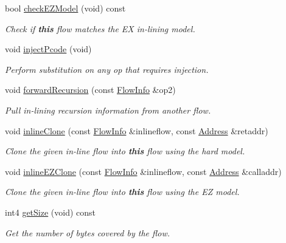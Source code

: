 \begin{DoxyCompactItemize}
bool \mbox{\hyperlink{class_flow_info_a30fc4e81c062827b6e9f31c6ab6cd983}{check\+E\+Z\+Model}} (void) const
\begin{DoxyCompactList}\small\item\em Check if {\bfseries{this}} flow matches the EX in-\/lining model. \end{DoxyCompactList}\item 
void \mbox{\hyperlink{class_flow_info_af91718ae694b4852c24f4af6cb0b07a0}{inject\+Pcode}} (void)
\begin{DoxyCompactList}\small\item\em Perform substitution on any op that requires {\itshape injection}. \end{DoxyCompactList}\item 
void \mbox{\hyperlink{class_flow_info_a47f656fb99cdb06587c0e86d86a6ff84}{forward\+Recursion}} (const \mbox{\hyperlink{class_flow_info}{Flow\+Info}} \&op2)
\begin{DoxyCompactList}\small\item\em Pull in-\/lining recursion information from another flow. \end{DoxyCompactList}\item 
void \mbox{\hyperlink{class_flow_info_acb0b9cbb6144cd2963c63072d6d72882}{inline\+Clone}} (const \mbox{\hyperlink{class_flow_info}{Flow\+Info}} \&inlineflow, const \mbox{\hyperlink{class_address}{Address}} \&retaddr)
\begin{DoxyCompactList}\small\item\em Clone the given in-\/line flow into {\bfseries{this}} flow using the {\itshape hard} model. \end{DoxyCompactList}\item 
void \mbox{\hyperlink{class_flow_info_a5819105426192965fb0a73831a785060}{inline\+E\+Z\+Clone}} (const \mbox{\hyperlink{class_flow_info}{Flow\+Info}} \&inlineflow, const \mbox{\hyperlink{class_address}{Address}} \&calladdr)
\begin{DoxyCompactList}\small\item\em Clone the given in-\/line flow into {\bfseries{this}} flow using the EZ model. \end{DoxyCompactList}\item 
int4 \mbox{\hyperlink{class_flow_info_ac233a410fc8046f112adfc20c5507984}{get\+Size}} (void) const
\begin{DoxyCompactList}\small\item\em Get the number of bytes covered by the flow. \end{DoxyCompactList}\item 

\end{DoxyCompactItemize}
